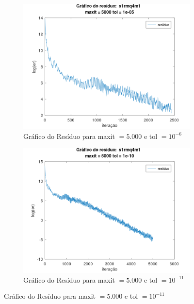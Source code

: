 \begin{figure}[H]
    \centering
    \begin{subfigure}[t]{0.4\linewidth}
         \centering
         \includegraphics[width=\textwidth]{image/s1rmq4m1_5000_-6.png}
         \caption{Gráfico do Resíduo para maxit $= 5.000$ e tol $=10^{-6}$}
         \label{fig:s1rmq4m1-5-6}
    \end{subfigure}
    \quad
    \begin{subfigure}[t]{0.4\linewidth}
         \centering
         \includegraphics[width=\textwidth]{image/s1rmq4m1_5000_-11.png}
         \caption{Gráfico do Resíduo para maxit $= 5.000$ e tol $=10^{-11}$}
         \label{fig:s1rmq4m1-5-11}
    \end{subfigure}

\end{figure}
